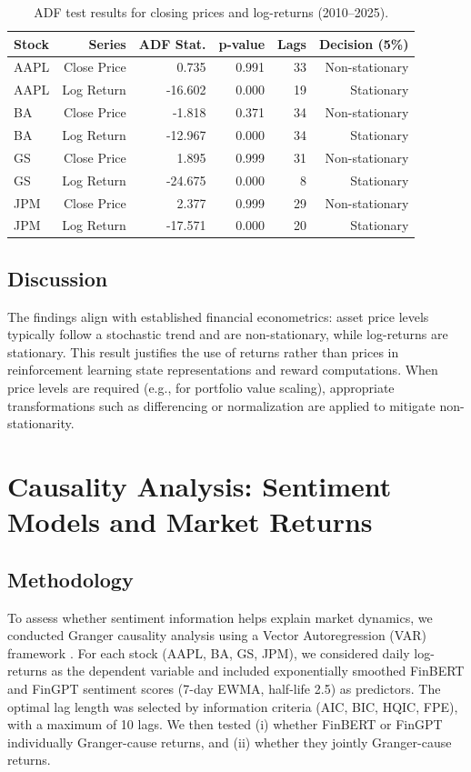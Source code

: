 \documentclass[12pt,a4paper]{report}
\begin{document}
\begin{table}[H]
\centering
\caption{ADF test results for closing prices and log-returns (2010--2025).}
\label{tab:adf-results}
\begin{tabular}{lrrrrr}
\toprule
\textbf{Stock} & \textbf{Series} & \textbf{ADF Stat.} & \textbf{p-value} & \textbf{Lags} & \textbf{Decision (5\%)} \\
\midrule
AAPL & Close Price  &  0.735  & 0.991 & 33 & Non-stationary \\
AAPL & Log Return   & -16.602 & 0.000 & 19 & Stationary \\
\midrule
BA   & Close Price  & -1.818  & 0.371 & 34 & Non-stationary \\
BA   & Log Return   & -12.967 & 0.000 & 34 & Stationary \\
\midrule
GS   & Close Price  &  1.895  & 0.999 & 31 & Non-stationary \\
GS   & Log Return   & -24.675 & 0.000 &  8 & Stationary \\
\midrule
JPM  & Close Price  &  2.377  & 0.999 & 29 & Non-stationary \\
JPM  & Log Return   & -17.571 & 0.000 & 20 & Stationary \\
\bottomrule
\end{tabular}
\end{table}

\subsection{Discussion}
The findings align with established financial econometrics: asset price levels typically
follow a stochastic trend and are non-stationary, while log-returns are stationary.
This result justifies the use of returns rather than prices in reinforcement learning
state representations and reward computations. When price levels are required (e.g.,
for portfolio value scaling), appropriate transformations such as differencing or
normalization are applied to mitigate non-stationarity.



\section{Causality Analysis: Sentiment Models and Market Returns}

\subsection{Methodology}
To assess whether sentiment information helps explain market dynamics, we conducted
Granger causality analysis using a Vector Autoregression (VAR) framework
\cite{granger1969investigating}. For each stock (AAPL, BA, GS, JPM), we considered
daily log-returns as the dependent variable and included exponentially smoothed
FinBERT and FinGPT sentiment scores (7-day EWMA, half-life 2.5) as predictors.
The optimal lag length was selected by information criteria (AIC, BIC, HQIC, FPE),
with a maximum of 10 lags.  
We then tested (i) whether FinBERT or FinGPT individually Granger-cause returns,
and (ii) whether they jointly Granger-cause returns.
\end{document}
